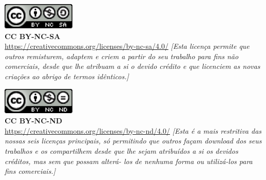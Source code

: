 
\noindent
\includegraphics[]{images/CCBYNCSA.png}
\\
\textbf{CC BY-NC-SA}
\\
\url{https://creativecommons.org/licenses/by-nc-sa/4.0/}
\textit{[Esta licença permite que outros remisturem, adaptem e criem a partir do seu trabalho para fins não comerciais, desde que lhe atribuam a si o devido crédito e que licenciem as novas criações ao abrigo de termos idênticos.]}


\noindent
\includegraphics[]{images/CCBYNCND.png}
\\
\textbf{CC BY-NC-ND}
\\
\url{https://creativecommons.org/licenses/by-nc-nd/4.0/}
\textit{[Esta é a mais restritiva das nossas seis licenças principais, só permitindo que outros façam download dos seus trabalhos e os compartilhem desde que lhe sejam atribuídos a si os devidos créditos, mas sem que possam alterá- los de nenhuma forma ou utilizá-los para fins comerciais.]}

\setlength{\parskip}{0em}